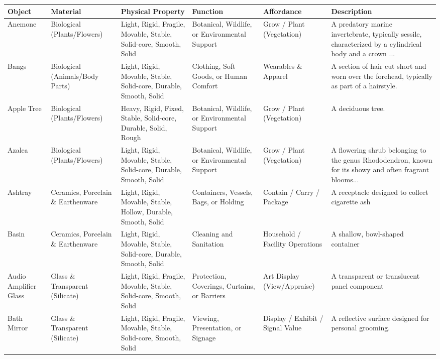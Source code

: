 \begin{table}[t]
\centering
\small
\begin{tabular}{p{2cm}p{2.5cm}p{2.5cm}p{2.5cm}p{2.5cm}p{4cm}}
\toprule
Object & Material & Physical Property & Function & Affordance & Description \\
\midrule
Anemone & Biological (Plants/Flowers) & Light, Rigid, Fragile, Movable, Stable, Solid-core, Smooth, Solid & Botanical, Wildlife, or Environmental Support & Grow / Plant (Vegetation) & A predatory marine invertebrate, typically sessile, characterized by a cylindrical body and a crown ... \\
Bangs & Biological (Animals/Body Parts) & Light, Rigid, Movable, Stable, Solid-core, Durable, Smooth, Solid & Clothing, Soft Goods, or Human Comfort & Wearables \& Apparel & A section of hair cut short and worn over the forehead, typically as part of a hairstyle. \\
Apple Tree & Biological (Plants/Flowers) & Heavy, Rigid, Fixed, Stable, Solid-core, Durable, Solid, Rough & Botanical, Wildlife, or Environmental Support & Grow / Plant (Vegetation) & A deciduous tree. \\
Azalea & Biological (Plants/Flowers) & Light, Rigid, Movable, Stable, Solid-core, Durable, Smooth, Solid & Botanical, Wildlife, or Environmental Support & Grow / Plant (Vegetation) & A flowering shrub belonging to the genus Rhododendron, known for its showy and often fragrant blooms... \\
Ashtray & Ceramics, Porcelain \& Earthenware & Light, Rigid, Movable, Stable, Hollow, Durable, Smooth, Solid & Containers, Vessels, Bags, or Holding & Contain / Carry / Package & A receptacle designed to collect cigarette ash \\
Basin & Ceramics, Porcelain \& Earthenware & Light, Rigid, Movable, Stable, Solid-core, Durable, Smooth, Solid & Cleaning and Sanitation & Household / Facility Operations & A shallow, bowl-shaped container \\
Audio Amplifier Glass & Glass \& Transparent (Silicate) & Light, Rigid, Fragile, Movable, Stable, Solid-core, Smooth, Solid & Protection, Coverings, Curtains, or Barriers & Art Display (View/Appraise) & A transparent or translucent panel component \\
Bath Mirror & Glass \& Transparent (Silicate) & Light, Rigid, Fragile, Movable, Stable, Solid-core, Smooth, Solid & Viewing, Presentation, or Signage & Display / Exhibit / Signal Value & A reflective surface designed for personal grooming. \\

\end{tabular}
\end{table}
